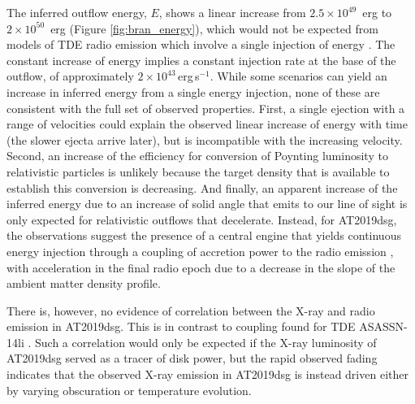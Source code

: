 The inferred outflow energy, $E$, shows a linear increase from $2.5 \times 10^{49}$~erg to $2 \times 10^{50}$~erg (Figure \ref{fig:bran_energy}), which would not be expected from models of TDE radio emission which involve a single injection of energy . The constant increase of energy implies a constant injection rate at the base of the outflow, of approximately $2\times10^{43}$\,erg\,s$^{-1}$. While some scenarios can yield an increase in inferred energy from a single energy injection, none of these are consistent with the full set of observed properties. First, a single ejection with a range of velocities could explain the observed linear increase of energy with time (the slower ejecta arrive later), but is incompatible with the increasing velocity. Second, an increase of the efficiency for conversion of Poynting luminosity to relativistic particles is unlikely because the target density that is available to establish this conversion is decreasing.  And finally, an apparent increase of the inferred energy due to an increase of solid angle that emits to our line of sight is only expected for relativistic outflows that decelerate. Instead, for AT2019dsg, the observations suggest the presence of a central engine that yields continuous energy injection through a coupling of accretion power to the radio emission , with acceleration in the final radio epoch due to a decrease in the slope of the ambient matter density profile. 

There is, however, no evidence of correlation between the X-ray and radio emission in AT2019dsg. This is in contrast to coupling found for TDE ASASSN-14li . Such a correlation would only be expected if the X-ray luminosity of AT2019dsg served as a tracer of disk power, but the rapid observed fading indicates that the observed X-ray emission in AT2019dsg is instead driven either by varying obscuration or temperature evolution. 


